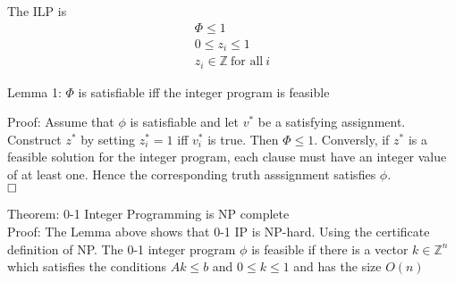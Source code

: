 \documentclass[mathserif]{beamer}
\renewcommand{\qed}{\hfill\square}
\begin{document}
\begin{frame}
The ILP is
\begin{align*}
\Phi \leq 1\\
0 \leq z_i \leq 1\\
z_i \in \mathbb{Z}\ \text{for all}\ i
\end{align*}

Lemma 1: $\Phi$ is satisfiable iff the integer program is feasible
\end{frame}

\begin{frame}
Proof: Assume that $\phi$ is satisfiable and let $v^*$ be a satisfying
assignment. Construct $z^*$ by setting $z^*_i = 1$ iff $v^*_i$ is true. Then
$\Phi \leq 1$.
Conversly, if $z^*$ is a feasible solution for the integer program, each clause
must have an integer value of at least one. Hence the corresponding truth
asssignment satisfies $\phi$.\\
$\qed$

Theorem: 0-1 Integer Programming is NP complete\\

Proof: The Lemma above shows that 0-1 IP is NP-hard. Using the certificate
definition of NP. The 0-1 integer program $\phi$ is feasible if there is a
vector $k \in \mathbb{Z}^n$ which satisfies the conditions $Ak \leq b$ and $0
\leq k \leq 1$ and has the size $O(n)$
\end{frame}
\end{document}
